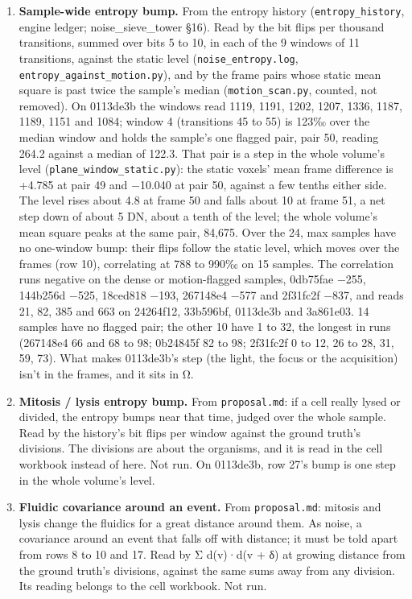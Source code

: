 \begin{enumerate}
\item \textbf{Sample-wide entropy bump.} From the entropy history (\texttt{entropy\_\allowbreak{}history}, engine ledger; noise\_\allowbreak{}sieve\_\allowbreak{}tower §16). Read by the bit flips per thousand transitions, summed over bits 5 to 10, in each of the 9 windows of 11 transitions, against the static level (\texttt{noise\_\allowbreak{}entropy.\allowbreak{}log}, \texttt{entropy\_\allowbreak{}against\_\allowbreak{}motion.\allowbreak{}py}), and by the frame pairs whose static mean square is past twice the sample's median (\texttt{motion\_\allowbreak{}scan.\allowbreak{}py}, counted, not removed). On 0113de3b the windows read 1119, 1191, 1202, 1207, 1336, 1187, 1189, 1151 and 1084; window 4 (transitions 45 to 55) is 123‰ over the median window and holds the sample's one flagged pair, pair 50, reading 264.2 against a median of 122.3. That pair is a step in the whole volume's level (\texttt{plane\_\allowbreak{}window\_\allowbreak{}static.\allowbreak{}py}): the static voxels' mean frame difference is +4.785 at pair 49 and −10.040 at pair 50, against a few tenths either side. The level rises about 4.8 at frame 50 and falls about 10 at frame 51, a net step down of about 5 DN, about a tenth of the level; the whole volume's mean square peaks at the same pair, 84,675. Over the 24, max samples have no one-window bump: their flips follow the static level, which moves over the frames (row 10), correlating at 788 to 990‰ on 15 samples. The correlation runs negative on the dense or motion-flagged samples, 0db75fae −255, 144b256d −525, 18ced818 −193, 267148e4 −577 and 2f31fc2f −837, and reads 21, 82, 385 and 663 on 24264f12, 33b596bf, 0113de3b and 3a861e03. 14 samples have no flagged pair; the other 10 have 1 to 32, the longest in runs (267148e4 66 and 68 to 98; 0b24845f 82 to 98; 2f31fc2f 0 to 12, 26 to 28, 31, 59, 73). What makes 0113de3b's step (the light, the focus or the acquisition) isn't in the frames, and it sits in Ω.
\item \textbf{Mitosis / lysis entropy bump.} From \texttt{proposal.\allowbreak{}md}: if a cell really lysed or divided, the entropy bumps near that time, judged over the whole sample. Read by the history's bit flips per window against the ground truth's divisions. The divisions are about the organisms, and it is read in the cell workbook instead of here. Not run. On 0113de3b, row 27's bump is one step in the whole volume's level.
\item \textbf{Fluidic covariance around an event.} From \texttt{proposal.\allowbreak{}md}: mitosis and lysis change the fluidics for a great distance around them. As noise, a covariance around an event that falls off with distance; it must be told apart from rows 8 to 10 and 17. Read by Σ d(v)·d(v + δ) at growing distance from the ground truth's divisions, against the same sums away from any division. Its reading belongs to the cell workbook. Not run.

\end{enumerate}
